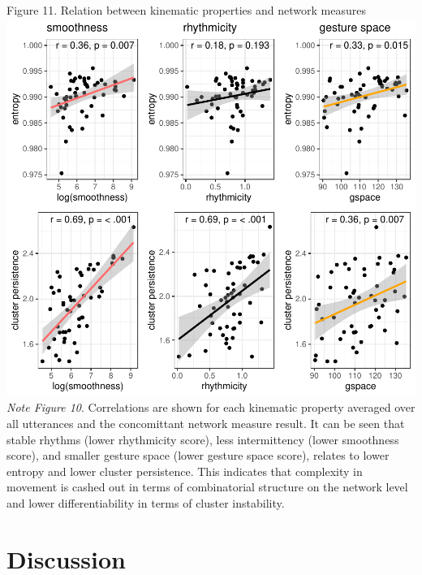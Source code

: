 \documentclass[
  man, noextraspace,floatsintext]{apa6}
\begin{document}
Figure 11. Relation between kinematic properties and network measures
\includegraphics{GNet_WP_files/figure-latex/test_network_kinematics-1.pdf}
\emph{Note Figure 10}. \small Correlations are shown for each kinematic property averaged over all utterances and the concomittant network measure result. It can be seen that stable rhythms (lower rhythmicity score), less intermittency (lower smoothness score), and smaller gesture space (lower gesture space score), relates to lower entropy and lower cluster persistence. This indicates that complexity in movement is cashed out in terms of combinatorial structure on the network level and lower differentiability in terms of cluster instability. \normalsize

\pagebreak

\hypertarget{discussion}{%
\section{Discussion}\label{discussion}}
\end{document}

